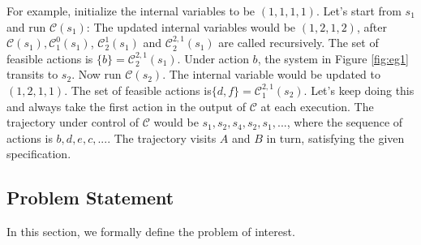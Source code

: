 \begin{example}
	For example, initialize the internal variables to be $ (1,1,1,1) $. Let's start from $ s_1 $ and run $ \mathcal{C}(s_1) $: The updated internal variables would be $ (1,2,1,2) $, after $ \mathcal{C}(s_1), \mathcal{C}^0_1(s_1)$, $ \mathcal{C}^1_2(s_1) $ and $ \mathcal{C}^{2,1}_2(s_1) $ are called recursively. The set of feasible actions is $ \{b\}= \mathcal{C}^{2,1}_2(s_1) $. Under action $ b $, the system in Figure \ref{fig:eg1} transits to $ s_2 $. Now run $ \mathcal{C}(s_2) $. The internal variable would be updated to $ (1,2,1,1) $. The set of feasible actions is$ \{d,f\}=\mathcal{C}^{2,1}_1(s_2) $. Let's keep doing this and always take the first action in the output of $ \mathcal{C} $ at each execution. The trajectory under control of $\mathcal{C} $ would be $ s_1,s_2,s_4,s_2,s_1,...$, where the sequence of actions is $ b,d,e,c,... $. The trajectory visits $ A $ and $ B $ in turn, satisfying the given specification.
	
\end{example}


\subsection{Problem Statement}
\label{sec:prob}
In this section, we formally define the problem of interest. %


